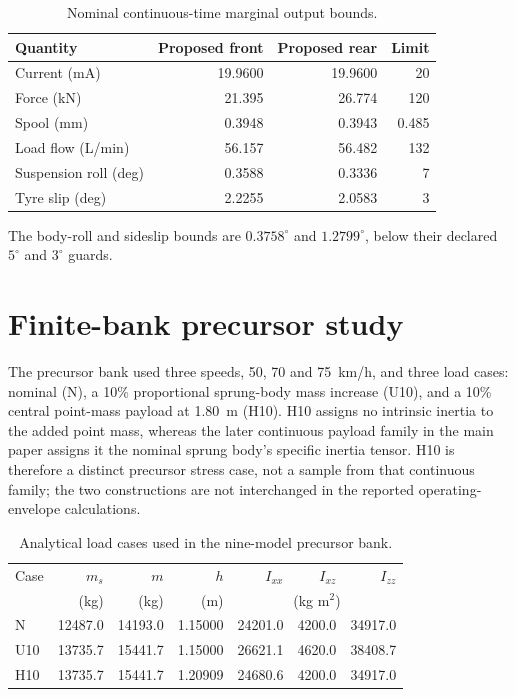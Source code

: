 \documentclass[10pt,a4paper]{article}
\begin{document}
\begin{table}[htbp]
\centering\small
\caption{Nominal continuous-time marginal output bounds.}
\begin{tabular}{lrrr}
\toprule
Quantity & Proposed front & Proposed rear & Limit\\
\midrule
Current (mA) & 19.9600 & 19.9600 & 20\\
Force (kN) & 21.395 & 26.774 & 120\\
Spool (mm) & 0.3948 & 0.3943 & 0.485\\
Load flow (L/min) & 56.157 & 56.482 & 132\\
Suspension roll (deg) & 0.3588 & 0.3336 & 7\\
Tyre slip (deg) & 2.2255 & 2.0583 & 3\\
\bottomrule
\end{tabular}
\end{table}
The body-roll and sideslip bounds are $0.3758^\circ$ and $1.2799^\circ$, below their declared $5^\circ$ and $3^\circ$ guards.

\section{Finite-bank precursor study}

The precursor bank used three speeds, 50, 70 and \SI{75}{km/h}, and three load cases: nominal (N), a 10\% proportional sprung-body mass increase (U10), and a 10\% central point-mass payload at \SI{1.80}{m} (H10). H10 assigns no intrinsic inertia to the added point mass, whereas the later continuous payload family in the main paper assigns it the nominal sprung body's specific inertia tensor. H10 is therefore a distinct precursor stress case, not a sample from that continuous family; the two constructions are not interchanged in the reported operating-envelope calculations.

\begin{table}[htbp]
\centering\small
\caption{Analytical load cases used in the nine-model precursor bank.}
\begin{tabular}{lrrrrrr}
\toprule
Case & $m_s$ & $m$ & $h$ & $I_{xx}$ & $I_{xz}$ & $I_{zz}$\\
 & (kg) & (kg) & (m) & \multicolumn{3}{c}{(kg m$^2$)}\\
\midrule
N & 12487.0 & 14193.0 & 1.15000 & 24201.0 & 4200.0 & 34917.0\\
U10 & 13735.7 & 15441.7 & 1.15000 & 26621.1 & 4620.0 & 38408.7\\
H10 & 13735.7 & 15441.7 & 1.20909 & 24680.6 & 4200.0 & 34917.0\\
\bottomrule
\end{tabular}
\end{table}
\end{document}
